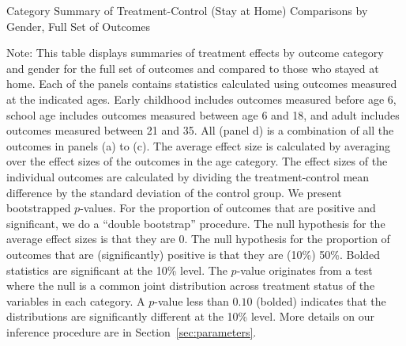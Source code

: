 \begin{table}[h!]
\centering
\begin{threeparttable}
\caption{Category Summary of Treatment-Control (Stay at Home) Comparisons by Gender, Full Set of Outcomes}\label{tab:rosenbaum-table-cats-exp-TvCh-big}

\begin{tablenotes}
\item  \tiny Note:  This table displays summaries of treatment effects by outcome category and gender for the full set of outcomes and compared to those who stayed at home. Each of the panels contains statistics calculated using outcomes measured at the indicated ages. Early childhood includes outcomes measured before age 6, school age includes outcomes measured between age 6 and 18, and adult includes outcomes measured between 21 and 35. All (panel d) is a combination of all the outcomes in panels (a) to (c). The average effect size is calculated by averaging over the effect sizes of the outcomes in the age category. The effect sizes of the individual outcomes are calculated by dividing the treatment-control mean difference by the standard deviation of the control group. We present bootstrapped $p$-values. For the proportion of outcomes that are positive and significant, we do a ``double bootstrap'' procedure. The null hypothesis for the average effect sizes is that they are 0. The null hypothesis for the proportion of outcomes that are (significantly) positive is that they are (10\%) 50\%. Bolded statistics are significant at the 10\% level. The \citet{Rosenbaum_2005_Distribution_JRSS} $p$-value originates from a test where the null is a common joint distribution  across treatment status of the variables in each category. A $p$-value less than $0.10$ (bolded) indicates that the distributions are significantly different at the 10\% level. More details on our inference procedure are in Section~\ref{sec:parameters}.
\end{tablenotes}
\end{threeparttable}
\end{table}

